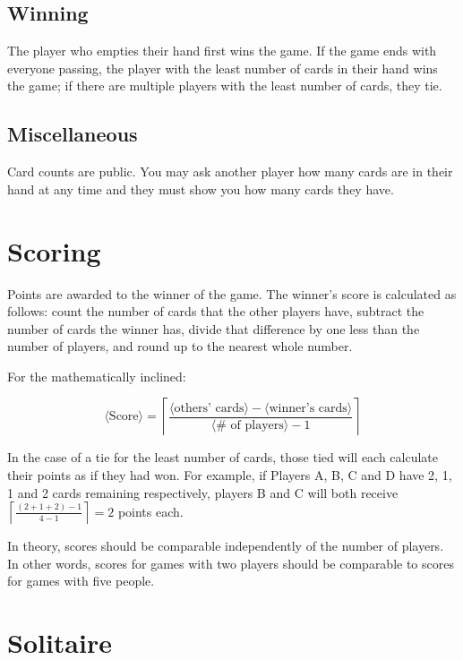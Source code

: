 \documentclass{article}
\begin{document}
\subsection{Winning}

The player who empties their hand first wins the game. If the game ends with everyone passing, the player with the least number of cards in their hand wins the game; if there are multiple players with the least number of cards, they tie.

\subsection{Miscellaneous}

Card counts are public. You may ask another player how many cards are in their hand at any time and they must show you how many cards they have.

\pagebreak
\section{Scoring}

Points are awarded to the winner of the game. The winner's score is calculated as follows: count the number of cards that the other players have, subtract the number of cards the winner has, divide that difference by one less than the number of players, and round up to the nearest whole number.

For the mathematically inclined:

$$
\langle\textrm{Score}\rangle = \left\lceil\frac{\langle\textrm{others'\ cards}\rangle - \langle\textrm{winner's\ cards}\rangle}{\langle\textrm{\#\ of\ players}\rangle - 1}\right\rceil
$$

In the case of a tie for the least number of cards, those tied will each calculate their points as if they had won. For example, if Players A, B, C and D have 2, 1, 1 and 2 cards remaining respectively, players B and C will both receive $\left\lceil\frac{(2+1+2) - 1}{4 - 1}\right\rceil = 2$ points each.

In theory, scores should be comparable independently of the number of players. In other words, scores for games with two players should be comparable to scores for games with five people.

\pagebreak
\section{Solitaire}
\label{sec:solitaire}
\end{document}
